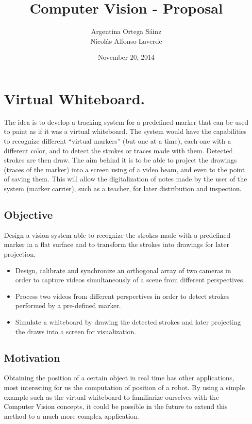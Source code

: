 \documentclass[a4paper,12pt]{article}
\title{Computer Vision - Proposal}
\author{Argentina Ortega Sáinz \\
        Nicolás Alfonso Laverde}
\date{November 20, 2014}
\begin{document}
\maketitle
{}
\section*{Virtual Whiteboard.}

The idea is to develop a tracking system for a predefined marker that can be used to paint as if it was a virtual whiteboard. The system would have the capabilities to recognize different “virtual markers” (but one at a time), each one with a different color, and to detect the strokes or traces made with them. Detected strokes are then draw.
The aim behind it is to be able to project the drawings (traces of the marker) into a screen using of a video beam, and even to the point of saving them. This will allow the digitalization of notes made by the user of the system (marker carrier), such as a teacher, for later distribution and inspection.
\subsection*{Objective}
Design a vision system able to recognize the strokes made with a predefined marker in a flat surface and to transform the strokes into drawings for later projection.
\begin{itemize}
\item Design, calibrate and synchronize an orthogonal array of two cameras in order to capture videos simultaneously of a scene from different perspectives.
\item Process two videos from different perspectives in order to detect strokes performed by a pre-defined marker.
\item Simulate a whiteboard by drawing the detected strokes and later projecting the draws into a screen for visualization.
\end{itemize}
\subsection*{Motivation}
Obtaining the position of a certain object in real time has other applications, most interesting for us the computation of position of a robot. By using a simple example such as the virtual whiteboard to familiarize ourselves with the Computer Vision concepts, it could be possible in the future to extend this method to a much more complex application.
\end{document}
